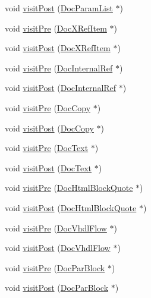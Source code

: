 \begin{DoxyCompactItemize}
\item 
void \hyperlink{class_latex_doc_visitor_ad49d5835981ba74f3290de78135bcaad}{visit\+Post} (\hyperlink{class_doc_param_list}{Doc\+Param\+List} $\ast$)
\item 
void \hyperlink{class_latex_doc_visitor_a35972044410355ad4fdba46f28d3662a}{visit\+Pre} (\hyperlink{class_doc_x_ref_item}{Doc\+X\+Ref\+Item} $\ast$)
\item 
void \hyperlink{class_latex_doc_visitor_af78a8450032f3441ced71b982604d8d8}{visit\+Post} (\hyperlink{class_doc_x_ref_item}{Doc\+X\+Ref\+Item} $\ast$)
\item 
void \hyperlink{class_latex_doc_visitor_aa3df7cc730044d18aaf6da3037630705}{visit\+Pre} (\hyperlink{class_doc_internal_ref}{Doc\+Internal\+Ref} $\ast$)
\item 
void \hyperlink{class_latex_doc_visitor_a57dc462a1ecfd608dc22b38e10abf81a}{visit\+Post} (\hyperlink{class_doc_internal_ref}{Doc\+Internal\+Ref} $\ast$)
\item 
void \hyperlink{class_latex_doc_visitor_ae70eff91f66fa9d2a50be0b13900e157}{visit\+Pre} (\hyperlink{class_doc_copy}{Doc\+Copy} $\ast$)
\item 
void \hyperlink{class_latex_doc_visitor_a4d27558d9f9feaf442e9f0f74312e08c}{visit\+Post} (\hyperlink{class_doc_copy}{Doc\+Copy} $\ast$)
\item 
void \hyperlink{class_latex_doc_visitor_ae203ea73132e153ccf0d304010ae548c}{visit\+Pre} (\hyperlink{class_doc_text}{Doc\+Text} $\ast$)
\item 
void \hyperlink{class_latex_doc_visitor_a3186b4b9b7ab652bc82a33c892614f40}{visit\+Post} (\hyperlink{class_doc_text}{Doc\+Text} $\ast$)
\item 
void \hyperlink{class_latex_doc_visitor_a8b303b2ec9beb2d2e497c5ecea00910f}{visit\+Pre} (\hyperlink{class_doc_html_block_quote}{Doc\+Html\+Block\+Quote} $\ast$)
\item 
void \hyperlink{class_latex_doc_visitor_a41aead323ae3fc25b5c4d84e898118a8}{visit\+Post} (\hyperlink{class_doc_html_block_quote}{Doc\+Html\+Block\+Quote} $\ast$)
\item 
void \hyperlink{class_latex_doc_visitor_a05c1a39db5c04b389b4dbff2cba451b1}{visit\+Pre} (\hyperlink{class_doc_vhdl_flow}{Doc\+Vhdl\+Flow} $\ast$)
\item 
void \hyperlink{class_latex_doc_visitor_a3353f7b7acca94ca4a604cf4192a880d}{visit\+Post} (\hyperlink{class_doc_vhdl_flow}{Doc\+Vhdl\+Flow} $\ast$)
\item 
void \hyperlink{class_latex_doc_visitor_a663576b832d9f14635490ac680471ccb}{visit\+Pre} (\hyperlink{class_doc_par_block}{Doc\+Par\+Block} $\ast$)
\item 
void \hyperlink{class_latex_doc_visitor_a71f56c235067a09f2a7eb82f054d6b90}{visit\+Post} (\hyperlink{class_doc_par_block}{Doc\+Par\+Block} $\ast$)
\end{DoxyCompactItemize}


